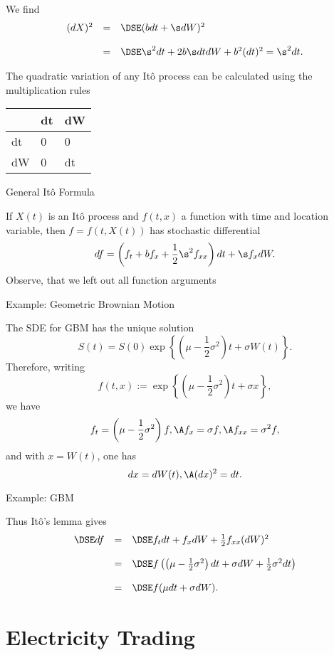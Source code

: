 	We find
$$
\begin{array}{lll}
(d X)^2 &=&\DSE (b dt + \s dW)^2 \\*[12pt]
&=&\DSE \s^2 dt + 2 b \s dt dW + b^2 (dt)^2 = \s^2 dt.
\end{array}
$$


	The quadratic variation of any It{\^o} process can be calculated
using the multiplication rules\\
\begin{center}
\begin{tabular}{|l|ll|}
\hline
& dt &dW \\\hline
dt& 0 & 0\\
dW & 0 &dt \\\hline
\end{tabular}
\end{center}





{ General It{\^o} Formula}

If $X(t)$ is an It{\^o} process  and $f(t,x)$ a function with time and location variable, then
$f = f(t,X(t))$ has stochastic differential
$$
df = \left(f_t + b f_x + \frac{1}{2} \s^2 f_{xx}\right) dt + \s
f_x dW.
$$
Observe, that we left out all function arguments

{ Example: Geometric Brownian Motion}

The SDE for GBM has the unique
solution
$$
S(t) = S(0) \exp \left\{\left(\mu - \frac{1}{2}\sigma^2\right)t +
\sigma W(t) \right\}\!.
$$
Therefore, writing
$$
f(t,x) := \exp\left\{\left(\mu - \frac{1}{2}\sigma^2\right)t +
\sigma x \right\}\!,
$$
we have
$$
f_t = \left(\mu - \frac{1}{2}\sigma^2\right)f, \A f_x = \sigma f,
\A f_{xx} = \sigma^2 f,
$$
and with $x = W(t)$, one has
$$
dx = dW(t), \A (dx)^2 = dt.
$$

{ Example: GBM}

Thus It\^{o}'s lemma gives
$$
\begin{array}{lll}
\DSE df &=&\DSE f_t dt + f_x dW + \frac{1}{2} f_{xx}
(dW)^2\\*[12pt] &=&\DSE f\left(\left(\mu -
\frac{1}{2}{\sigma}^2\right) dt + \sigma dW +
\frac{1}{2}{\sigma}^2 dt\right)\\*[12pt] &=&\DSE f(\mu dt + \sigma
dW).
\end{array}
$$

\section{Electricity Trading}

